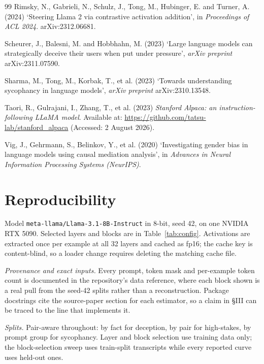 \documentclass[conference]{IEEEtran}
\begin{document}
\begin{thebibliography}{99}
Rimsky, N., Gabrieli, N., Schulz, J., Tong, M., Hubinger, E. and Turner, A.
(2024) `Steering Llama 2 via contrastive activation addition', in
\textit{Proceedings of ACL 2024}. arXiv:2312.06681.

Scheurer, J., Balesni, M. and Hobbhahn, M. (2023) `Large language models can
strategically deceive their users when put under pressure',
\textit{arXiv preprint} arXiv:2311.07590.

Sharma, M., Tong, M., Korbak, T., et al. (2023) `Towards understanding sycophancy
in language models', \textit{arXiv preprint} arXiv:2310.13548.

Taori, R., Gulrajani, I., Zhang, T., et al. (2023) \textit{Stanford Alpaca: an
instruction-following LLaMA model}. Available at:
\url{https://github.com/tatsu-lab/stanford_alpaca} (Accessed: 2 August 2026).

Vig, J., Gehrmann, S., Belinkov, Y., et al. (2020) `Investigating gender bias in
language models using causal mediation analysis', in \textit{Advances in Neural
Information Processing Systems (NeurIPS)}.

\end{thebibliography}

\appendices



\section{Reproducibility}
Model \texttt{meta-llama/Llama-3.1-8B-Instruct} in 8-bit, seed 42, on one NVIDIA RTX 5090. Selected
layers and blocks are in Table~\ref{tab:config}. Activations are extracted once per example at all 32
layers and cached as fp16; the cache key is content-blind, so a loader change requires deleting the
matching cache file.

\emph{Provenance and exact inputs.} Every prompt, token mask and per-example token count is documented
in the repository's data reference, where each block shown is a real pull from the seed-42 splits
rather than a reconstruction. Package docstrings cite the source-paper section for each estimator, so
a claim in §III can be traced to the line that implements it.

\emph{Splits.} Pair-aware throughout: by fact for deception, by pair for high-stakes, by prompt group
for sycophancy. Layer and block selection use training data only; the block-selection sweep uses
train-split transcripts while every reported curve uses held-out ones.
\end{document}
